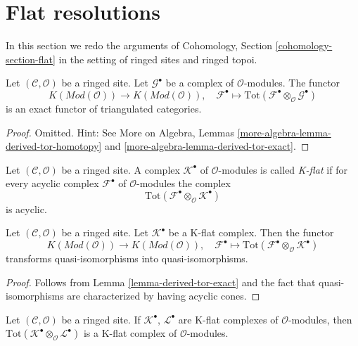 \section{Flat resolutions}
\label{section-flat}

\noindent
In this section we redo the arguments of
Cohomology, Section \ref{cohomology-section-flat}
in the setting of ringed sites and ringed topoi.

\begin{lemma}
\label{lemma-derived-tor-exact}
Let $(\mathcal{C}, \mathcal{O})$ be a ringed site.
Let $\mathcal{G}^\bullet$ be a complex of $\mathcal{O}$-modules.
The functor
$$
K(\textit{Mod}(\mathcal{O}))
\longrightarrow
K(\textit{Mod}(\mathcal{O})),
\quad
\mathcal{F}^\bullet \longmapsto
\text{Tot}(\mathcal{F}^\bullet \otimes_\mathcal{O} \mathcal{G}^\bullet)
$$
is an exact functor of triangulated categories.
\end{lemma}

\begin{proof}
Omitted. Hint: See
More on Algebra, Lemmas \ref{more-algebra-lemma-derived-tor-homotopy} and
\ref{more-algebra-lemma-derived-tor-exact}.
\end{proof}

\begin{definition}
\label{definition-K-flat}
Let $(\mathcal{C}, \mathcal{O})$ be a ringed site.
A complex $\mathcal{K}^\bullet$ of $\mathcal{O}$-modules is
called {\it K-flat} if for every acyclic complex $\mathcal{F}^\bullet$
of $\mathcal{O}$-modules the complex
$$
\text{Tot}(\mathcal{F}^\bullet \otimes_\mathcal{O} \mathcal{K}^\bullet)
$$
is acyclic.
\end{definition}

\begin{lemma}
\label{lemma-K-flat-quasi-isomorphism}
Let $(\mathcal{C}, \mathcal{O})$ be a ringed site.
Let $\mathcal{K}^\bullet$ be a K-flat complex.
Then the functor
$$
K(\textit{Mod}(\mathcal{O}))
\longrightarrow
K(\textit{Mod}(\mathcal{O})), \quad
\mathcal{F}^\bullet
\longmapsto
\text{Tot}(\mathcal{F}^\bullet \otimes_\mathcal{O} \mathcal{K}^\bullet)
$$
transforms quasi-isomorphisms into quasi-isomorphisms.
\end{lemma}

\begin{proof}
Follows from
Lemma \ref{lemma-derived-tor-exact}
and the fact that quasi-isomorphisms are characterized by having
acyclic cones.
\end{proof}

\begin{lemma}
\label{lemma-tensor-product-K-flat}
Let $(\mathcal{C}, \mathcal{O})$ be a ringed site.
If $\mathcal{K}^\bullet$, $\mathcal{L}^\bullet$ are K-flat complexes
of $\mathcal{O}$-modules, then
$\text{Tot}(\mathcal{K}^\bullet \otimes_\mathcal{O} \mathcal{L}^\bullet)$
is a K-flat complex of $\mathcal{O}$-modules.
\end{lemma}

